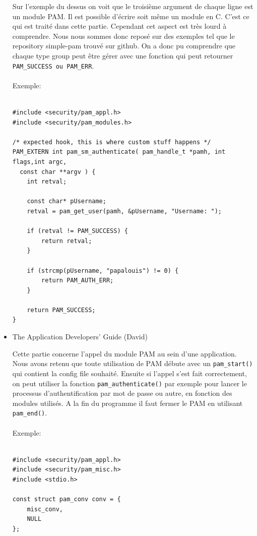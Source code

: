 \documentclass{article}
\begin{document}
\begin{itemize}
Sur l’exemple du dessus on voit que le troisième argument de chaque ligne est
un module PAM. Il est possible d’écrire soit même un module en C. C’est ce qui
est traité dans cette partie. Cependant cet aspect est très lourd à comprendre.
Nous nous sommes donc reposé sur des exemples tel que le repository simple-pam
trouvé sur github. On a donc pu comprendre que chaque type group peut être
gérer avec une fonction qui peut retourner \texttt{PAM\_SUCCESS ou PAM\_ERR}.
\\ \\
    Exemple:

  \begin{verbatim}

#include <security/pam_appl.h>
#include <security/pam_modules.h>

/* expected hook, this is where custom stuff happens */
PAM_EXTERN int pam_sm_authenticate( pam_handle_t *pamh, int flags,int argc,
  const char **argv ) {
	int retval;

	const char* pUsername;
	retval = pam_get_user(pamh, &pUsername, "Username: ");

	if (retval != PAM_SUCCESS) {
		return retval;
	}

	if (strcmp(pUsername, "papalouis") != 0) {
		return PAM_AUTH_ERR;
	}

	return PAM_SUCCESS;
}
\end{verbatim}

    \item{The Application Developers' Guide (David)}

    \vspace{0.05cm}

  Cette partie concerne l’appel du module PAM au sein d’une application. Nous
  avons retenu que toute utilisation de PAM débute avec un \texttt{pam\_start()}
  qui contient la config file souhaité. Ensuite si l’appel s’est fait
  correctement, on peut utiliser la fonction \texttt{pam\_authenticate()} par
  exemple pour lancer le processus d’authentification par mot de passe ou
  autre, en fonction des modules utilisés. A la fin du programme il faut fermer
  le PAM en utilisant \texttt{pam\_end()}.
\\ \\
    Exemple:

  \begin{verbatim}

#include <security/pam_appl.h>
#include <security/pam_misc.h>
#include <stdio.h>

const struct pam_conv conv = {
	misc_conv,
	NULL
};


\end{verbatim}
\end{itemize}
\end{document}
